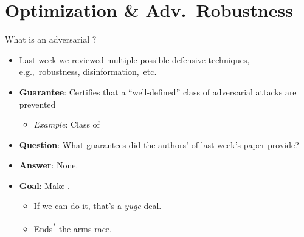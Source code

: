 \section{Optimization \& Adv.\ Robustness}


\begin{frame}{What is an adversarial ?}
  \begin{itemize}[<+->]
    \setlength{\itemsep}{20pt}
    \item Last week we reviewed multiple possible defensive techniques, e.g.,~robustness, disinformation,~etc.
    \item \textbf{Guarantee}: Certifies that a ``well-defined'' class of adversarial attacks are prevented
      \begin{itemize}
        \item \textit{Example}: Class of \textbf{}
      \end{itemize}

    \item \textbf{Question}: What guarantees did the authors' of last week's paper provide?
    \vspace{-14pt}
    \item \textbf{Answer}: None. 

    \item \textbf{Goal}: Make \textbf{}.
      \begin{itemize}[<+->]
        \item If we can do it, that's a \textit{yuge} deal.
        \item Ends\textsuperscript{*} the arms race.
      \end{itemize}
  \end{itemize}
\end{frame}


